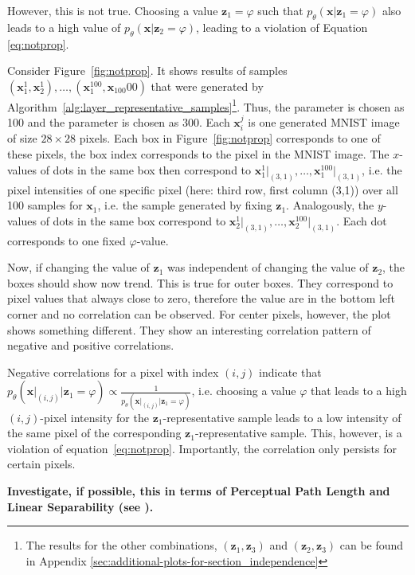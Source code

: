 However, this is not true.
Choosing a value $\bm{z}_1 = \varphi$ such that $p_\theta(\bm{x} | \bm{z}_1 = \varphi)$ also leads to a high value of $p_\theta(\bm{x} | \bm{z}_2 = \varphi)$, leading to a violation of Equation \ref{eq:notprop}.

Consider Figure~\ref{fig:notprop}.
It shows results of samples $(\bm{x}_1^1,\bm{x}_2^1),\dots,(\bm{x}_1^{100},\bm{x}_{100}00)$ that were generated by Algorithm~\ref{alg:layer_representative_samples}\footnote{The results for the other combinations, $(\bm{z}_1,\bm{z}_3)$ and $(\bm{z}_2,\bm{z}_3)$ can be found in Appendix \ref{sec:additional-plots-for-section_independence}}.
Thus, the parameter  is chosen as 100 and the parameter  is chosen as 300.
Each $\bm{x}_i^j$ is one generated MNIST image of size $28\times 28$ pixels.
Each box in Figure~\ref{fig:notprop} corresponds to one of these pixels, the box index corresponds to the pixel in the MNIST image.
The $x$-values of dots in the same box then correspond to $\bm{x}_1^1\big|_{(3,1)}, \dots, \bm{x}_1^{100}\big|_{(3,1)}$, i.e. the pixel intensities of one specific pixel (here: third row, first column (3,1)) over all 100 samples for $\bm{x}_1$, i.e. the sample generated by fixing $\bm{z}_1$.
Analogously, the $y$-values of dots in the same box correspond to $\bm{x}_2^1\big|_{(3,1)}, \dots, \bm{x}_2^{100}\big|_{(3,1)}$.
Each dot corresponds to one fixed $\varphi$-value.

Now, if changing the value of $\bm{z}_1$ was independent of changing the value of $\bm{z}_2$, the boxes should show now trend.
This is true for outer boxes.
They correspond to pixel values that always close to zero, therefore the value are in the bottom left corner and no correlation can be observed.
For center pixels, however, the plot shows something different.
They show an interesting correlation pattern of negative and positive correlations.

Negative correlations for a pixel with index $(i,j)$ indicate that $p_\theta(\bm{x}\big|_{(i,j)} | \bm{z}_1 = \varphi) \propto \frac{1}{p_\theta(\bm{x}\big|_{(i,j)} | \bm{z}_1 = \varphi)}$, i.e. choosing a value $\varphi$ that leads to a high $(i,j)$-pixel intensity for the $\bm{z}_1$-representative sample leads to a low intensity of the same pixel of the corresponding $\bm{z}_1$-representative sample.
This, however, is a violation of equation~\ref{eq:notprop}.
Importantly, the correlation only persists for certain pixels.

\textbf{Investigate, if possible, this in terms of Perceptual Path Length and Linear Separability (see \citet{karras2019style}).}

